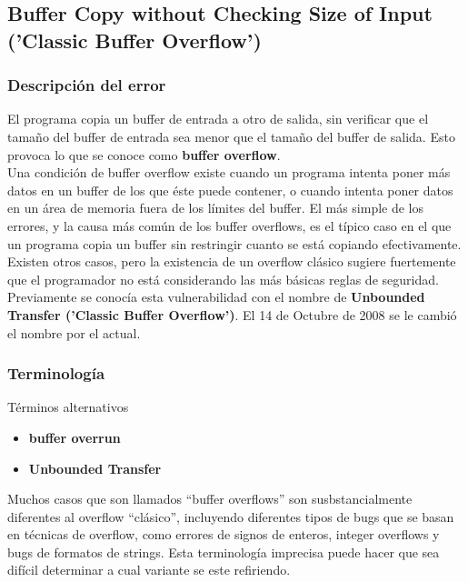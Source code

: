 \subsection{Buffer Copy without Checking Size of Input ('Classic Buffer Overflow')}

\subsubsection{Descripción del error}

El programa copia un buffer de entrada a otro de salida, sin verificar que el tamaño del buffer de entrada sea menor que el tamaño del buffer de salida. Esto provoca 
lo que se conoce como \textbf{buffer overflow}.\\

Una condición de buffer overflow existe cuando un programa intenta poner más datos en un buffer de los que éste puede contener, o cuando intenta poner datos en un área de memoria
fuera de los límites del buffer. El más simple de los errores, y la causa más común de los buffer overflows, es el típico caso en el que un programa copia un buffer sin 
restringir cuanto se está copiando efectivamente. Existen otros casos, pero la existencia de un overflow clásico sugiere fuertemente que el programador no está considerando 
las más básicas reglas de seguridad. \\

Previamente se conocía esta vulnerabilidad con el nombre de \textbf{Unbounded Transfer ('Classic Buffer Overflow')}. El 14 de Octubre de 2008 se le cambió el nombre por el actual.

\subsubsection{Terminología}
Términos alternativos
\begin{itemize}
    \item \textbf{buffer overrun}
    \item \textbf{Unbounded Transfer}
\end{itemize}

Muchos casos que son llamados ``buffer overflows'' son susbstancialmente diferentes al overflow ``clásico'', incluyendo diferentes tipos de bugs que se basan en técnicas 
de overflow, como errores de signos de enteros, integer overflows y bugs de formatos de strings. Esta terminología imprecisa puede hacer que sea difícil determinar a cual 
variante se este refiriendo.

